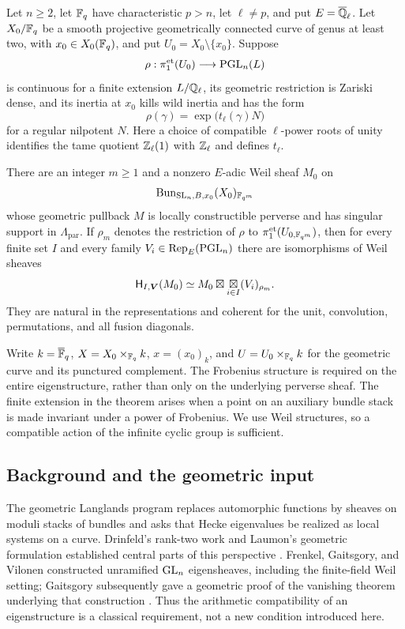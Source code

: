 \begin{theorem}\label{thm:main}
Let $n\geq2$, let $\mathbb F_q$ have characteristic $p>n$, let $\ell\ne p$,
and put $E=\overline{\mathbb Q}_{\ell}$. Let $X_0/\mathbb F_q$ be a smooth projective geometrically
connected curve of genus at least two, with $x_0\in X_0(\mathbb F_q)$, and
put $U_0=X_0\setminus\{x_0\}$. Suppose
\[
 \rho:\pi_1^{\mathrm{et}}(U_0)\longrightarrow\mathrm{PGL}_n(L)
\]
is continuous for a finite extension $L/\mathbb Q_\ell$, its geometric
restriction is Zariski dense, and its inertia at $x_0$ kills wild inertia
and has the form
\begin{equation}\label{eq:regular-monodromy}
 \rho(\gamma)=\exp\bigl(t_\ell(\gamma)N\bigr)
\end{equation}
for a regular nilpotent $N$. Here a choice of compatible
$\ell$-power roots of unity identifies the tame quotient
$\mathbb Z_\ell(1)$ with $\mathbb Z_\ell$ and defines $t_\ell$.

There are an integer $m\geq1$ and a nonzero $E$-adic Weil sheaf $M_0$ on
\[
 \operatorname{Bun}_{\mathrm{SL}_n,B,x_0}(X_0)_{\mathbb F_{q^m}}
\]
whose geometric pullback $M$ is locally constructible perverse and has
singular support in $\Lambda_{\mathrm{par}}$. If $\rho_m$ denotes the
restriction of $\rho$ to $\pi_1^{\mathrm{et}}(U_{0,\mathbb F_{q^m}})$, then
for every finite set $I$ and every family
$V_i\in\operatorname{Rep}_E(\mathrm{PGL}_n)$ there are isomorphisms of Weil sheaves
\begin{equation}\label{eq:main-eigenmaps}
 \mathsf H_{I,\boldsymbol V}(M_0)
   \simeq M_0\boxtimes\mathop{\boxtimes}_{i\in I}(V_i)_{\rho_m}.
\end{equation}
They are natural in the representations and coherent for the unit,
convolution, permutations, and all fusion diagonals.
\end{theorem}

Write $k=\overline{\mathbb F}_q$, $X=X_0\times_{\mathbb F_q}k$, $x=(x_0)_k$, and
$U=U_0\times_{\mathbb F_q}k$ for the geometric curve and its punctured complement.
The Frobenius structure is required on the entire eigenstructure, rather
than only on the underlying perverse sheaf. The finite extension in the
theorem arises when a point on an auxiliary bundle stack is made invariant
under a power of Frobenius. We use Weil structures, so a compatible action
of the infinite cyclic group is sufficient.

\subsection{Background and the geometric input}

The geometric Langlands program replaces automorphic functions by sheaves
on moduli stacks of bundles and asks that Hecke eigenvalues be realized as
local systems on a curve. Drinfeld's rank-two work and Laumon's geometric
formulation established central parts of this perspective
\cite{Drinfeld,Laumon}. Frenkel, Gaitsgory, and Vilonen constructed
unramified $\mathrm{GL}_n$ eigensheaves, including the finite-field Weil setting;
Gaitsgory subsequently gave a geometric proof of the vanishing theorem
underlying that construction \cite{FGV,GaitsgoryVanishing}. Thus the
arithmetic compatibility of an eigenstructure is a classical requirement,
not a new condition introduced here.

